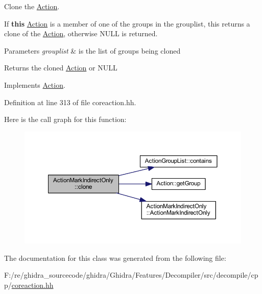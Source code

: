 Clone the \mbox{\hyperlink{class_action}{Action}}. 

If {\bfseries{this}} \mbox{\hyperlink{class_action}{Action}} is a member of one of the groups in the grouplist, this returns a clone of the \mbox{\hyperlink{class_action}{Action}}, otherwise N\+U\+LL is returned. 
\begin{DoxyParams}{Parameters}
{\em grouplist} & is the list of groups being cloned \\
\hline
\end{DoxyParams}
\begin{DoxyReturn}{Returns}
the cloned \mbox{\hyperlink{class_action}{Action}} or N\+U\+LL 
\end{DoxyReturn}


Implements \mbox{\hyperlink{class_action_af8242e41d09e5df52f97df9e65cc626f}{Action}}.



Definition at line 313 of file coreaction.\+hh.

Here is the call graph for this function\+:
\nopagebreak
\begin{figure}[H]
\begin{center}
\leavevmode
\includegraphics[width=350pt]{class_action_mark_indirect_only_ac53f9107d3a9c5be4576867c9eb8ad01_cgraph}
\end{center}
\end{figure}


The documentation for this class was generated from the following file\+:\begin{DoxyCompactItemize}
\item 
F\+:/re/ghidra\+\_\+sourcecode/ghidra/\+Ghidra/\+Features/\+Decompiler/src/decompile/cpp/\mbox{\hyperlink{coreaction_8hh}{coreaction.\+hh}}\end{DoxyCompactItemize}
